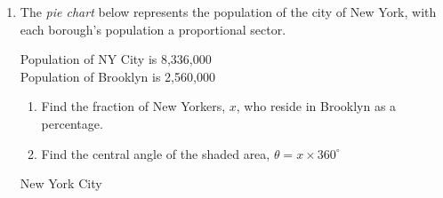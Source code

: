 \begin{enumerate}
\item The \emph{pie chart} below represents the population of the city of New York, with each borough's population a proportional sector.
  \begin{multicols}{2}
  \raggedcolumns
  Population of NY City is 8,336,000\\
  Population of Brooklyn is 2,560,000
  \begin{enumerate}%
    \item Find the fraction of New Yorkers, $x$, who reside in Brooklyn as a percentage. \vspace{2cm}
    \item Find the central angle of the shaded area, $\theta = x \times 360^\circ$
  \end{enumerate}
  \columnbreak
  \begin{flushright}
    New York City
  \end{flushright}
  \end{multicols}


\end{enumerate}
